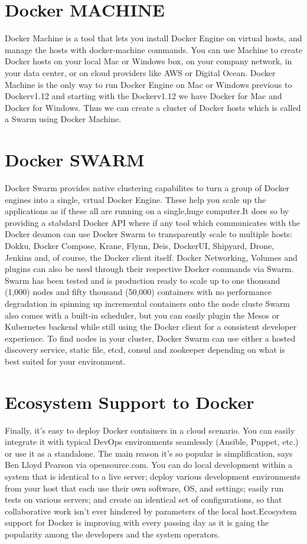 \documentclass[9pt,twocolumn,twoside]{styles/osajnl}
\begin{document}
\section{Docker MACHINE}

\cite{www-docker-machine}Docker Machine is a tool that lets you install 
Docker Engine on virtual hosts, and manage the hosts with docker-machine 
commands. You can use Machine to create Docker hosts on your local Mac 
or Windows box, on your company network, in your data center, or on 
cloud providers like AWS or Digital Ocean. Docker Machine is the only 
way to run Docker Engine on Mac or Windows previous to Dockerv1.12 
and starting with the Dockerv1.12 we have Docker for Mac and Docker for 
Windows. Thus we can create a cluster of Docker hosts which is called
a Swarm using Docker Machine.

\section{Docker SWARM}
\cite{www-docker-swarm}Docker Swarm provides native clustering 
capabilites to turn a group of Docker engines into a single, vrtual 
Docker Engine. These help you scale up the applications as if these all 
are running on a single,huge computer.It does so by
providing a stabdard Docker API where if any tool which communicates
with the Docker deamon can use Docker Swarm to transparently scale to
multiple hosts: Dokku, Docker Compose, Krane, Flynn, Deis, DockerUI,
Shipyard, Drone, Jenkins and, of course, the Docker client itself.
Docker Networking, Volumes and plugins can also be used through their
respective Docker commands via Swarm. Swarm has been tested and is
production ready to scale up to one thousand (1,000) nodes and fifty
thousand (50,000) containers with no performance degradation in
spinning up incremental containers onto the node cluste Swarm also
comes with a built-in scheduler, but you can easily plugin the Mesos
or Kubernetes backend while still using the Docker client for a
consistent developer experience. To find nodes in your cluster, Docker
Swarm can use either a hosted discovery service, static file, etcd,
consul and zookeeper depending on what is best suited for your
environment.


\section{Ecosystem Support to Docker}
\cite{www-docker-1}Finally, it’s easy to deploy Docker containers in a cloud
scenario. You can easily integrate it with typical DevOps environments
seamlessly (Ansible, Puppet, etc.) or use it as a standalone. The main
reason it’s so popular is simplification, says Ben Lloyd Pearson via
opensource.com. You can do local development within a system that is
identical to a live server; deploy various development environments
from your host that each use their own software, OS, and settings;
easily run tests on various servers; and create an identical set of
configurations, so that collaborative work isn’t ever hindered by
parameters of the local host.Ecosystem support for Docker is
improving with every passing day as it is gaing the popularity among
the developers and the system operators.
\end{document}
